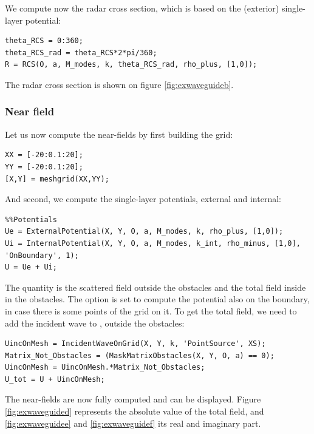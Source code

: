 We compute now the radar cross section, which is  based on the (exterior) single-layer potential:
\begin{lstlisting}
theta_RCS = 0:360;
theta_RCS_rad = theta_RCS*2*pi/360;
R = RCS(O, a, M_modes, k, theta_RCS_rad, rho_plus, [1,0]);
\end{lstlisting}
The radar cross section is shown on figure \ref{fig:exwaveguideb}. 

\subsubsection{Near field}

Let us now compute  the near-fields by first building the grid:
\begin{lstlisting}
XX = [-20:0.1:20];
YY = [-20:0.1:20];
[X,Y] = meshgrid(XX,YY);
\end{lstlisting}
And second, we compute the single-layer potentials, external and internal:
\begin{lstlisting}
%%Potentials
Ue = ExternalPotential(X, Y, O, a, M_modes, k, rho_plus, [1,0]);
Ui = InternalPotential(X, Y, O, a, M_modes, k_int, rho_minus, [1,0], 'OnBoundary', 1);
U = Ue + Ui;
\end{lstlisting}
The quantity  is the scattered field outside the obstacles and the total field inside in the obstacles. The option  is set to compute the potential also on the boundary, in case there is some points of the grid on it. To get the total field, we need to add the incident wave to , outside the obstacles:
\begin{lstlisting}
UincOnMesh = IncidentWaveOnGrid(X, Y, k, 'PointSource', XS);
Matrix_Not_Obstacles = (MaskMatrixObstacles(X, Y, O, a) == 0);
UincOnMesh = UincOnMesh.*Matrix_Not_Obstacles;
U_tot = U + UincOnMesh;
\end{lstlisting}
The near-fields are now fully computed and can be displayed. Figure \ref{fig:exwaveguided} represents the absolute value of the total field, and \ref{fig:exwaveguidee} and \ref{fig:exwaveguidef} its real and imaginary part.

